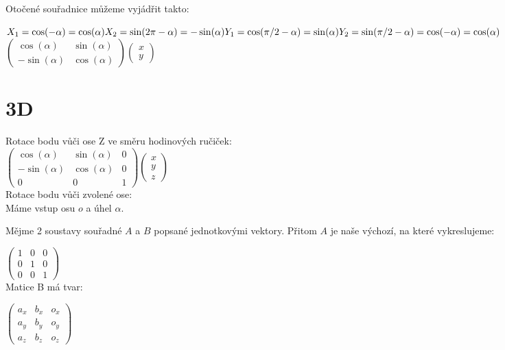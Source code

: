 \documentclass[a4paper,12pt]{book}
\begin{document}
Otočené souřadnice můžeme vyjádřit takto:


$X_1 = \cos(-\alpha) = \cos(\alpha)\\
X_2 = \sin(2\pi-\alpha) = -\sin(\alpha)\\
Y_1 = \cos(\pi/2 - \alpha) = \sin(\alpha)\\
Y_2 = \sin(\pi/2 - \alpha) = \cos(-\alpha) = \cos(\alpha)
$\\



$\begin{pmatrix}
\cos(\alpha) & \sin(\alpha)\\
-\sin(\alpha) & \cos(\alpha)
\end{pmatrix}\begin{pmatrix}x\\y\end{pmatrix}$



\section{3D}

Rotace bodu vůči ose Z ve směru hodinových ručiček:\\
$\begin{pmatrix}
\cos(\alpha) & \sin(\alpha) & 0\\
-\sin(\alpha) & \cos(\alpha) & 0\\
0 & 0 & 1
\end{pmatrix}\begin{pmatrix}x\\y\\z\end{pmatrix}$\\

Rotace bodu vůči zvolené ose:\\

Máme vstup osu $o$ a úhel $\alpha$. 

Mějme 2 soustavy souřadné $A$ a $B$ popsané jednotkovými vektory. Přitom $A$ je naše výchozí, na které vykreslujeme:

$\begin{pmatrix}
1 & 0 & 0\\
0 & 1 & 0\\
0 & 0 & 1
\end{pmatrix}$\\

Matice B má tvar:

$\begin{pmatrix}
a_x& b_x& o_x\\
a_y & b_y& o_y\\
a_z & b_z & o_z
\end{pmatrix}$\\
\end{document}
